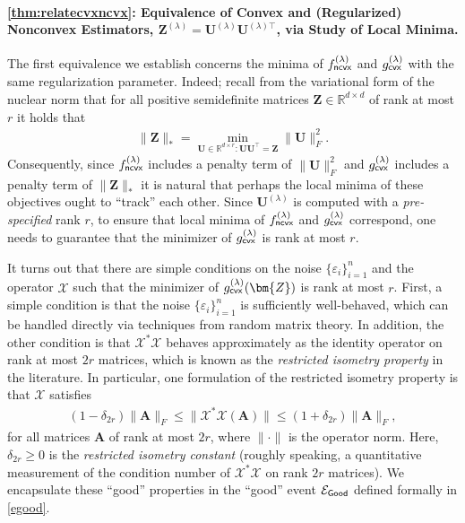 \documentclass[10pt]{article}
\newcommand{\eps}{\ensuremath{\varepsilon}}
\newcommand{\s}{^*}
\renewcommand{\t}{^{\top}}
\theoremstyle{definition}
\begin{document}
\paragraph{\cref{thm:relatecvxncvx}: Equivalence of Convex and (Regularized) Nonconvex Estimators, $\bm{Z}^{(\lambda)} = \bm{U}^{(\lambda)} \bm{U}^{(\lambda)\top}$, via Study of Local Minima.}  
The first equivalence we establish concerns the minima of $f^{(\lambda)}_{{\sf ncvx}}$ and $g^{(\lambda)}_{{\sf cvx}}$ with the same regularization parameter.  Indeed; recall from the variational form of the nuclear norm that for all positive semidefinite matrices $\bm{Z} \in \mathbb{R}^{d\times d}$ of rank at most $r$ it holds that 
\begin{align}
   \|\bm{Z} \|_* =  \min_{\bm{U} \in \mathbb{R}^{d \times r}: \bm{UU}\t = \bm{Z}} \| \bm{U} \|_F^2.
\end{align}
Consequently, since $f^{(\lambda)}_{{\sf ncvx}}$ includes a penalty term of $\|\bm{U}\|_F^2$ and $g^{(\lambda)}_{{\sf cvx}}$ includes a penalty term of $\|\bm{Z}\|_*$ it is natural that perhaps the local minima of these objectives ought to ``track'' each other.   
Since $\bm{U}^{(\lambda)}$ is computed with a \emph{pre-specified} rank $r$, to ensure that local minima of $f^{(\lambda)}_{{\sf ncvx}}$ and $g^{(\lambda)}_{{\sf cvx}}$ correspond, one needs to guarantee that the minimizer of $g^{(\lambda)}_{{\sf cvx}}$ is rank at most $r$. 

It turns out that there are simple conditions on the noise $\{\eps_i\}_{i=1}^{n}$ and the operator $\mathcal{X}$ such that the minimizer of $g_{{\sf cvx}}^{(\lambda)}(\bm{Z})$ is rank at most $r$. First, a simple condition is that the noise $\{\eps_i\}_{i=1}^{n}$ is sufficiently well-behaved, which can be handled directly via techniques from random matrix theory.  In addition, the other condition is that $\mathcal{X}\s\mathcal{X}$ behaves approximately as the identity operator on rank at most $2r$ matrices, which is known as the \emph{restricted isometry property} in the literature.  In particular, one formulation of the restricted isometry property is that $\mathcal{X}$ satisfies 
\begin{align}
    (1 - \delta_{2r}) \|\bm{A} \|_F \leq \| \mathcal{X}\s\mathcal{X}(\bm{A}) \| \leq (1 + \delta_{2r} ) \|\bm{A} \|_F,
\end{align}
for all matrices $\bm{A}$ of rank at most $2r$, where $\|\cdot\|$ is the operator norm. Here, $\delta_{2r}\geq 0$ is the \emph{restricted isometry constant} (roughly speaking, a quantitative measurement of the condition number of $\mathcal{X}\s\mathcal{X}$ on rank $2r$ matrices).  We encapsulate these ``good'' properties in the ``good'' event $\mathcal{E}_{{\sf Good}}$ defined formally in \eqref{egood}. 
\end{document}
